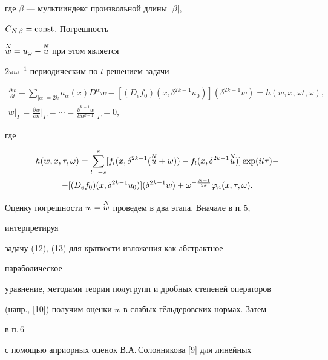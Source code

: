 где $\beta$ --- мультииндекс произвольной длины $|\beta|$, 


$C_{N,\beta}=\operatorname{const}$. Погрешность 


$\overset{N}{w}{}=u_\omega-\overset{N}{u}{}$ при этом является 


$2\pi\omega^{-1}$-периодическим по $t$ решением задачи 


\begin{gather} 


\frac{\partial w}{\partial t}-\sum_{|\alpha|=2k} 


a_\alpha(x)D^\alpha w-[(D_e f_0)(x,\delta^{2k-1}u_0)] 


(\delta^{2k-1}w)=h(w,x,\omega t,\omega), \\ 


% 


w|_{\Gamma}=\frac{\partial w}{\partial n} 


\bigg|_{\Gamma}=\dotsb= 


\frac{\partial^{k-1}w}{\partial n^{k-1}}\bigg|_{\Gamma}=0, 


\end{gather} 


где 


\begin{multline} 


h(w,x,\tau,\omega)=\sum^s_{l=-s}[f_l(x,\delta^{2k-1} 


(\up{N}{u}+w))-f_l(x,\delta^{2k-1}\up{N}{u})]\exp(i l\tau)- \\ -


[(D_e f_0)(x,\delta^{2k-1}u_0)] 


(\delta^{2k-1}w)+\omega^{-\frac{N+1}{2k}} 


\varphi_n(x,\tau,\omega). 


\end{multline} 


 


Оценку погрешности $w=\overset{N}{w}{}$ проведем в два этапа. Вначале в п.\,5, 


интерпретируя  


задачу (12), (13) для краткости изложения как абстрактное 


параболическое 


уравнение, методами теории полугрупп и дробных степеней операторов 


(напр., [10]) получим оценки $w$ в слабых г\"ельдеровских нормах. Затем 


в п.\,6 


с помощью априорных оценок В.А.\,Солонникова [9] для линейных 


